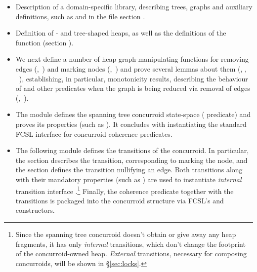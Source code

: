 \begin{itemize} 

\item Description of a domain-specific library, describing trees,
  graphs and auxiliary definitions, such as  and
   in the file section .

\item Definition of - and tree-shaped heaps, as well as
  the definitions of the  function (section
  ).

\item We next define a number of heap graph-manipulating functions for
  removing edges (\eg,~) and marking nodes
  (\eg,~) and prove several lemmas about them (\eg,
  , ~\etc), establishing, in
  particular, monotonicity results, describing the behaviour of
   and other predicates when the graph is being reduced
  via removal of edges (\eg,~).

\item The module  defines the spanning
  tree concurroid state-space ( predicate) and proves its
  properties (such as ). It concludes with
  instantiating the standard FCSL interface  for
  concurroid coherence predicates.

\item The following module  defines the
  transitions of the concurroid. In particular, the section
   describes the transition, corresponding to
  marking the node, and the section  defines
  the transition nullifying an edge. Both transitions along with their
  mandatory properties (such as ) are used to
  instantiate \emph{internal} transition interface
  .\footnote{Since the spanning tree concurroid
    doesn't obtain or give away any heap fragments, it has only
    \emph{internal} transitions, which don't change the footprint of
    the concurroid-owned heap. \emph{External} transitions, necessary
    for composing concurroids, will be shown in \S \ref{sec:locks}.}
  Finally, the coherence predicate together with the transitions is
  packaged into the concurroid structure  via FCSL's
   and  constructors.


\end{itemize}

